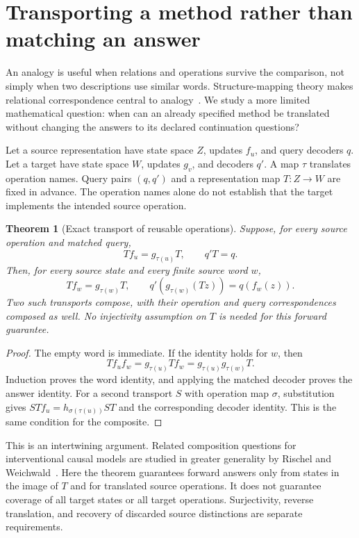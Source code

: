 \documentclass[11pt,letterpaper]{article}
\theoremstyle{plain}
\newtheorem{theorem}{Theorem}[section]
\theoremstyle{definition}
\begin{document}
\section{Transporting a method rather than matching an answer}\label{sec:transport}
An analogy is useful when relations and operations survive the comparison, not simply when two descriptions use similar words. Structure-mapping theory makes relational correspondence central to analogy~\cite{gentner}. We study a more limited mathematical question: when can an already specified method be translated without changing the answers to its declared continuation questions?

Let a source representation have state space $Z$, updates $f_u$, and query decoders $q$. Let a target have state space $W$, updates $g_v$, and decoders $q'$. A map $\tau$ translates operation names. Query pairs $(q,q')$ and a representation map $T:Z\to W$ are fixed in advance. The operation names alone do not establish that the target implements the intended source operation.

\begin{theorem}[Exact transport of reusable operations]\label{thm:transport}
Suppose, for every source operation and matched query,
\begin{equation}\label{eq:transport-exact}
T f_u=g_{\tau(u)}T,\qquad q'T=q.
\end{equation}
Then, for every source state and every finite source word $w$,
\[
T f_w=g_{\tau(w)}T,\qquad q'(g_{\tau(w)}(Tz))=q(f_w(z)).
\]
Two such transports compose, with their operation and query correspondences composed as well. No injectivity assumption on $T$ is needed for this forward guarantee.
\end{theorem}
\begin{proof}
The empty word is immediate. If the identity holds for $w$, then
\[
T f_u f_w=g_{\tau(u)}T f_w
=g_{\tau(u)}g_{\tau(w)}T.
\]
Induction proves the word identity, and applying the matched decoder proves the answer identity. For a second transport $S$ with operation map $\sigma$, substitution gives $STf_u=h_{\sigma(\tau(u))}ST$ and the corresponding decoder identity. This is the same condition for the composite.
\end{proof}
This is an intertwining argument. Related composition questions for interventional causal models are studied in greater generality by Rischel and Weichwald~\cite{rischel}. Here the theorem guarantees forward answers only from states in the image of $T$ and for translated source operations. It does not guarantee coverage of all target states or all target operations. Surjectivity, reverse translation, and recovery of discarded source distinctions are separate requirements.
\end{document}
